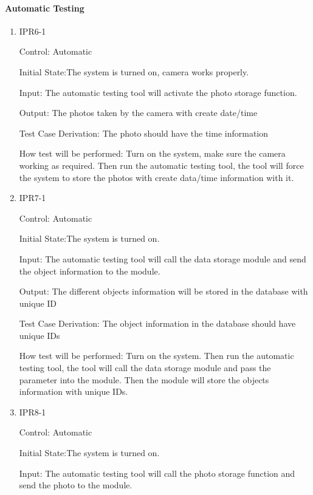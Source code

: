 \documentclass[12pt, titlepage]{article}
\begin{document}
\paragraph{Automatic Testing}

\begin{enumerate}

\item{IPR6-1\\}

Control: Automatic
					
Initial State:The system is turned on, camera works properly. 
					
Input: The automatic testing tool will activate the photo storage function. 
					
Output: The photos taken by the camera with create date/time

Test Case Derivation: The photo should have the time information
					
How test will be performed:
Turn on the system, make sure the camera working as required. Then run the automatic testing tool, the tool will force the system to store the photos with create data/time information with it.


\item{IPR7-1\\}

Control: Automatic
					
Initial State:The system is turned on.
					
Input: The automatic testing tool will call the data storage module and send the object information to the module. 
					
Output: The different objects information will be stored in the database with unique ID

Test Case Derivation: The object information in the database should have unique IDs
					
How test will be performed:
Turn on the system. Then run the automatic testing tool, the tool will call the data storage module and pass the parameter into the module. Then the module will store the objects information with unique IDs.


\item{IPR8-1\\}

Control: Automatic
					
Initial State:The system is turned on.
					
Input: The automatic testing tool will call the photo storage function and send the photo to the module. 
					

\end{enumerate}
\end{document}
